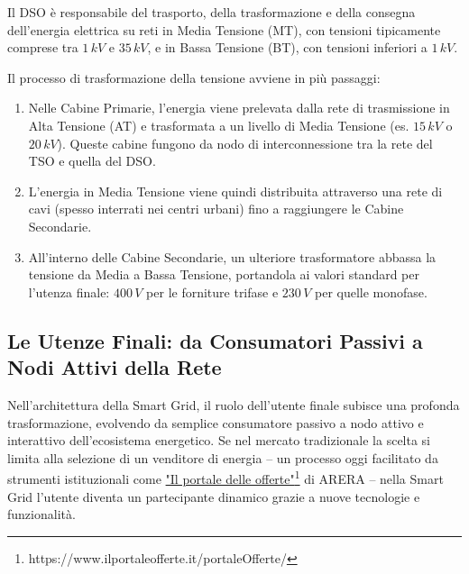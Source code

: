 Il DSO è responsabile del trasporto, della trasformazione e della consegna dell'energia elettrica su reti in Media Tensione (MT), con tensioni tipicamente comprese tra $1\,kV$ e $35\,kV$, e in Bassa Tensione (BT), con tensioni inferiori a $1\,kV$.


Il processo di trasformazione della tensione avviene in più passaggi:


\begin{enumerate}
    \item Nelle Cabine Primarie, l'energia viene prelevata dalla rete di trasmissione in Alta Tensione (AT) e trasformata a un livello di Media Tensione (es. $15\,kV$ o $20\,kV$). Queste cabine fungono da nodo di interconnessione tra la rete del TSO e quella del DSO.
    \item L'energia in Media Tensione viene quindi distribuita attraverso una rete di cavi (spesso interrati nei centri urbani) fino a raggiungere le Cabine Secondarie.
    \item All'interno delle Cabine Secondarie, un ulteriore trasformatore abbassa la tensione da Media a Bassa Tensione, portandola ai valori standard per l'utenza finale: $400\,V$ per le forniture trifase e $230\,V$ per quelle monofase.
\end{enumerate}


\subsection{Le Utenze Finali: da Consumatori Passivi a Nodi Attivi della Rete}






Nell'architettura della Smart Grid, il ruolo dell'utente finale subisce una profonda trasformazione, evolvendo da semplice consumatore passivo a nodo attivo e interattivo dell'ecosistema energetico. Se nel mercato tradizionale la scelta si limita alla selezione di un venditore di energia – un processo oggi facilitato da strumenti istituzionali come \href{https://www.ilportaleofferte.it/portaleOfferte/}{"Il portale delle offerte"}\footnote{https://www.ilportaleofferte.it/portaleOfferte/} di ARERA – nella Smart Grid l'utente diventa un partecipante dinamico grazie a nuove tecnologie e funzionalità.


